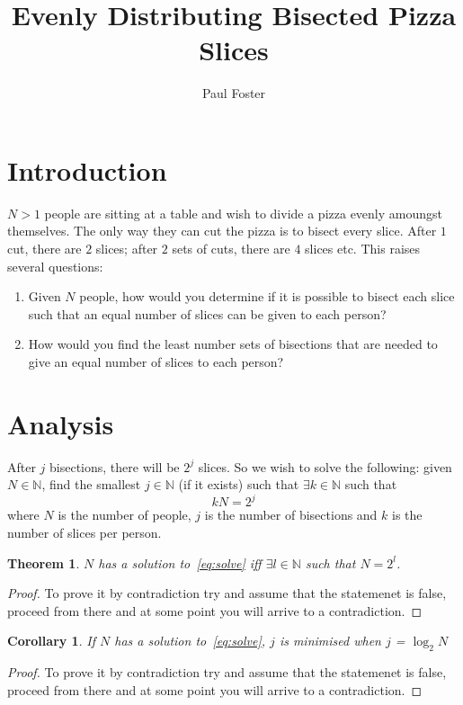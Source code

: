 \documentclass{article}
\title{Evenly Distributing Bisected Pizza Slices}
\author{Paul Foster}
\begin{document}
\maketitle

\newtheorem{theorem}{Theorem}
\newtheorem{corollary}{Corollary}[theorem]
\newtheorem{lemma}[theorem]{Lemma}

\section{Introduction}
$N>1$ people are sitting at a table and wish to divide a pizza evenly amoungst themselves. The only way they can cut the pizza is to bisect every slice. After $1$ cut, there are $2$ slices; after $2$ sets of cuts, there are $4$ slices etc. This raises several questions:
\begin{enumerate}
  \item Given $N$ people, how would you determine if it is possible to bisect each slice such that an equal number of slices can be given to each person?
  \item How would you find the least number sets of bisections that are needed to give an equal number of slices to each person?
\end{enumerate}

\section{Analysis}
After $j$ bisections, there will be $2^j$ slices. So we wish to solve the following: given $N \in \mathbb{N}$, find the smallest $j \in \mathbb{N}$ (if it exists) such that $\exists k \in \mathbb{N}$ such that
\begin{equation} \label{eq:solve}
  kN = 2^j
\end{equation}
where $N$ is the number of people, $j$ is the number of bisections and $k$ is the number of slices per person.

\begin{theorem}
$N$ has a solution to~\eqref{eq:solve} iff $\exists l \in \mathbb{N}$ such that $N = 2^l$.
\end{theorem}

\begin{proof}
To prove it by contradiction try and assume that the statemenet is false,
proceed from there and at some point you will arrive to a contradiction.
\end{proof}


\begin{corollary}
If $N$ has a solution to~\eqref{eq:solve}, $j$ is minimised when $j$ = $\log_2 N$
\end{corollary}

\begin{proof}
To prove it by contradiction try and assume that the statemenet is false,
proceed from there and at some point you will arrive to a contradiction.
\end{proof}
\end{document}
